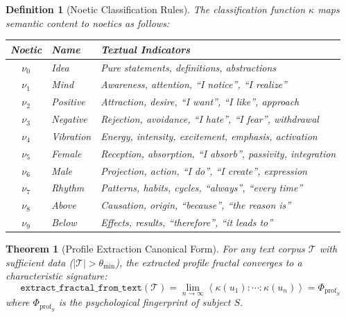 \documentclass[11pt,twoside]{book}
\renewcommand{\arraystretch}{1.2}
\newcommand{\noe}[1]{\nu_{#1}}
\newcommand{\ProfileFrac}{\Phi_{\mathrm{prof}}}
\newcommand{\TextCorpus}{\mathcal{T}}
\newtheorem{definition}{Definition}[chapter]
\newtheorem{theorem}{Theorem}[chapter]
\begin{document}
\begin{definition}[Noetic Classification Rules]
\label{def:noetic-class-rules}
The classification function $\kappa$ maps semantic content to noetics as follows:

\begin{center}
\footnotesize
\renewcommand{\arraystretch}{1.2}
\begin{tabularx}{\textwidth}{c|l|X}
\toprule
\textbf{Noetic} & \textbf{Name} & \textbf{Textual Indicators} \\
\midrule
$\noe{0}$ & Idea & Pure statements, definitions, abstractions \\
$\noe{1}$ & Mind & Awareness, attention, ``I notice'', ``I realize'' \\
$\noe{2}$ & Positive & Attraction, desire, ``I want'', ``I like'', approach \\
$\noe{3}$ & Negative & Rejection, avoidance, ``I hate'', ``I fear'', withdrawal \\
$\noe{4}$ & Vibration & Energy, intensity, excitement, emphasis, activation \\
$\noe{5}$ & Female & Reception, absorption, ``I absorb'', passivity, integration \\
$\noe{6}$ & Male & Projection, action, ``I do'', ``I create'', expression \\
$\noe{7}$ & Rhythm & Patterns, habits, cycles, ``always'', ``every time'' \\
$\noe{8}$ & Above & Causation, origin, ``because'', ``the reason is'' \\
$\noe{9}$ & Below & Effects, results, ``therefore'', ``it leads to'' \\
\bottomrule
\end{tabularx}
\end{center}
\end{definition}

\begin{theorem}[Profile Extraction Canonical Form]
\label{thm:profile-extraction}
For any text corpus $\TextCorpus$ with sufficient data ($|\TextCorpus| > \theta_{\min}$),
the extracted profile fractal converges to a characteristic signature:
\begin{equation}
\boxed{
    \texttt{extract\_fractal\_from\_text}(\TextCorpus) =
    \lim_{n \to \infty} \left\langle \kappa(u_1) : \cdots : \kappa(u_n) \right\rangle
    = \ProfileFrac_S
}
\end{equation}
where $\ProfileFrac_S$ is the \emph{psychological fingerprint} of subject $S$.
\end{theorem}
\end{document}
